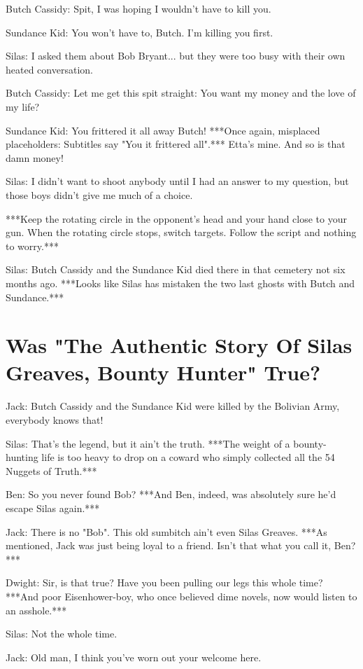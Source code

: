 \documentclass{article}
\begin{document}
Butch Cassidy: Spit, I was hoping I wouldn't have to kill you.

Sundance Kid: You won't have to, Butch. I'm killing you first.

Silas: I asked them about Bob Bryant... but they were too busy with their own heated conversation.

Butch Cassidy: Let me get this spit straight: You want my money and the love of my life?

Sundance Kid: You frittered it all away Butch! ***Once again, misplaced placeholders: Subtitles say "You it frittered all".*** Etta's mine. And so is that damn money!

Silas: I didn't want to shoot anybody until I had an answer to my question, but those boys didn't give me much of a choice.

***Keep the rotating circle in the opponent's head and your hand close to your gun. When the rotating circle stops, switch targets. Follow the script and nothing to worry.***

Silas: Butch Cassidy and the Sundance Kid died there in that cemetery not six months ago. ***Looks like Silas has mistaken the two last ghosts with Butch and Sundance.***

\section*{Was "The Authentic Story Of Silas Greaves, Bounty Hunter" True?}

Jack: Butch Cassidy and the Sundance Kid were killed by the Bolivian Army, everybody knows that!

Silas: That's the legend, but it ain't the truth. ***The weight of a bounty-hunting life is too heavy to drop on a coward who simply collected all the 54 Nuggets of Truth.***

Ben: So you never found Bob? ***And Ben, indeed, was absolutely sure he'd escape Silas again.***

Jack: There is no "Bob". This old sumbitch ain't even Silas Greaves. ***As mentioned, Jack was just being loyal to a friend. Isn't that what you call it, Ben?***

Dwight: Sir, is that true? Have you been pulling our legs this whole time? ***And poor Eisenhower-boy, who once believed dime novels, now would listen to an asshole.***

Silas: Not the whole time.

Jack: Old man, I think you've worn out your welcome here.
\end{document}
